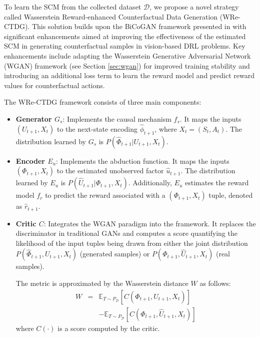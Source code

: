To learn the SCM from the collected dataset \( \mathcal{D} \),
we propose a novel strategy called
Wasserstein Reward-enhanced Counterfactual Data Generation (WRe-CTDG).
This solution builds upon the BiCoGAN framework presented in \cite{lu2020}
with significant enhancements
aimed at improving the effectiveness of the estimated SCM in generating
counterfactual samples in vision-based DRL problems. Key enhancements
include adapting the Wasserstein Generative Adversarial Network (WGAN)
framework (see Section \ref{sec:wgan})
for improved training stability and introducing an additional
loss term to learn the reward model and predict reward values for counterfactual
actions.

The WRe-CTDG framework consists of three main components:

\begin{itemize}
    \item \textbf{Generator \( G_s \)}:
    Implements the causal mechanism \( f_s \).
    It maps the inputs \( (U_{t+1}, X_t) \)
    to the next-state encoding \( \hat{\phi}_{t+1} \),
    where \( X_t = (S_t, A_t) \).
    The distribution learned by \( G_s \) is
    \( P(\hat{\Phi}_{t+1} | U_{t+1}, X_t) \).
    \item \textbf{Encoder \( E_u \)}: Implements the abduction function.
    It maps the inputs \( (\Phi_{t+1}, X_t) \) to the
    estimated unobserved factor \( \hat{u}_{t+1} \).
    The distribution learned by \( E_u \) is
    \( P(\hat{U}_{t+1} | \Phi_{t+1}, X_t) \).
    Additionally, \( E_u \) estimates the reward model \( f_r \)
    to predict the reward associated with a \( (\Phi_{t+1}, X_t) \)
    tuple, denoted as \( \hat{r}_{t+1} \).
    \item \textbf{Critic \( C \)}: Integrates the WGAN paradigm
    into the framework. It replaces the discriminator in
    traditional GANs and computes a score quantifying
    the likelihood of the input tuples being drawn
    from either the joint distribution
    \( P(\hat{\Phi}_{t+1}, U_{t+1}, X_t) \) (generated samples) or
    \( P(\Phi_{t+1}, \hat{U}_{t+1}, X_t) \) (real samples).
    
    The metric is approximated by the Wasserstein distance \( W \)
    as follows:
    \begin{equation}
        \begin{aligned}
            W &=& \mathbb{E}_{T \sim P_{\mathcal{D}}} \left[ C(\hat{\Phi}_{t+1}, U_{t+1}, X_t) \right] \\ 
            & &- \mathbb{E}_{T \sim P_{\mathcal{D}}} \left[ C(\Phi_{t+1}, \hat{U}_{t+1}, X_t) \right]
        \end{aligned}
    \end{equation}
    where $C(\cdot)$ is a score computed by the critic.
\end{itemize}

